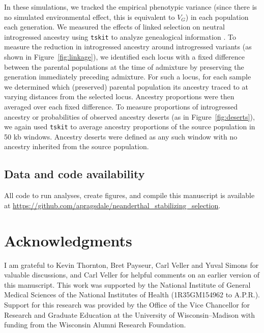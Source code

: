 \documentclass[10pt,letterpaper]{article}
\newcommand{\tskit}{\texttt{tskit}\xspace}
\begin{document}
In these simulations, we tracked the empirical phenotypic variance (since there
is no simulated environmental effect, this is equivalent to $V_G$) in each
population each generation. We measured the effects of linked selection on
neutral introgressed ancestry using \tskit to analyze genealogical
information \cite{ralph2020efficiently}. To measure the reduction in
introgressed ancestry around introgressed variants (as shown in
Figure~\ref{fig:linkage}), we identified each locus with a fixed difference
between the parental populations at the time of admixture by preserving the
generation immediately preceding admixture. For such a locus, for each sample
we determined which (preserved) parental population its ancestry traced to at
varying distances from the selected locus. Ancestry proportions were then
averaged over each fixed difference. To measure proportions of introgressed
ancestry or probabilities of observed ancestry deserts (as in
Figure~\ref{fig:deserts}), we again used \tskit to average ancestry proportions
of the source population in 50 kb windows. Ancestry deserts were defined as
any such window with no ancestry inherited from the source population.

\subsection*{Data and code availability}

All code to run analyses, create figures, and compile this manuscript is
available at
\url{https://github.com/apragsdale/neanderthal_stabilizing_selection}.


\section*{Acknowledgments}

I am grateful to Kevin Thornton, Bret Payseur, Carl Veller and Yuval Simons for
valuable discussions, and Carl Veller for helpful comments on an earlier
version of this manuscript. This work was supported by the National Institute
of General Medical Sciences of the National Institutes of Health (1R35GM154962
to A.P.R.). Support for this research was provided by the Office of the Vice
Chancellor for Research and Graduate Education at the University of
Wisconsin–Madison with funding from the Wisconsin Alumni Research Foundation.


%
\end{document}
